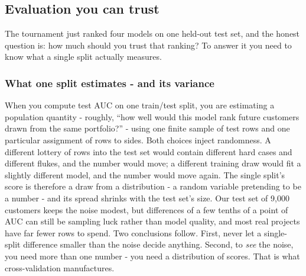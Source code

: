 \documentclass[11pt,a4paper]{article}
\begin{document}
\subsection{Evaluation you can trust}
The tournament just ranked four models on one held-out test set, and
the honest question is: how much should you trust that ranking? To
answer it you need to know what a single split actually measures.

\subsubsection{What one split estimates - and its variance}
When you compute test AUC on one train/test split, you are estimating
a population quantity - roughly, ``how well would this model rank
future customers drawn from the same portfolio?'' - using one finite
sample of test rows and one particular assignment of rows to sides.
Both choices inject randomness. A different lottery of rows into the
test set would contain different hard cases and different flukes, and
the number would move; a different training draw would fit a slightly
different model, and the number would move again. The single split's
score is therefore a draw from a distribution - a random variable
pretending to be a number - and its spread shrinks with the test
set's size. Our test set of 9{,}000 customers keeps the noise modest,
but differences of a few tenths of a point of AUC can still be
sampling luck rather than model quality, and most real projects have
far fewer rows to spend. Two conclusions follow. First, never let a
single-split difference smaller than the noise decide anything.
Second, to \emph{see} the noise, you need more than one number - you
need a distribution of scores. That is what cross-validation
manufactures.
\end{document}
